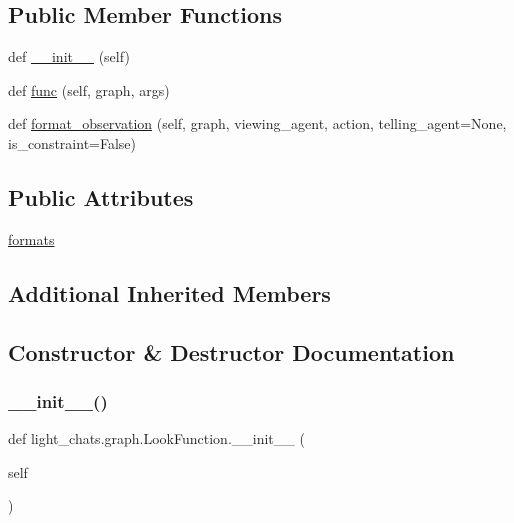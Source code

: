 \subsection*{Public Member Functions}
\begin{DoxyCompactItemize}
\item 
def \hyperlink{classlight__chats_1_1graph_1_1LookFunction_a2b2692f97a52251a450c60d10a80f37e}{\+\_\+\+\_\+init\+\_\+\+\_\+} (self)
\item 
def \hyperlink{classlight__chats_1_1graph_1_1LookFunction_aeaedd1fa680a930dc86a1120d9daf63d}{func} (self, graph, args)
\item 
def \hyperlink{classlight__chats_1_1graph_1_1LookFunction_a7723e1da8ce79443c49fd4a5f6dce978}{format\+\_\+observation} (self, graph, viewing\+\_\+agent, action, telling\+\_\+agent=None, is\+\_\+constraint=False)
\end{DoxyCompactItemize}
\subsection*{Public Attributes}
\begin{DoxyCompactItemize}
\item 
\hyperlink{classlight__chats_1_1graph_1_1LookFunction_a98ca1312bcaf009a34ee3e1b1b43a3d6}{formats}
\end{DoxyCompactItemize}
\subsection*{Additional Inherited Members}


\subsection{Constructor \& Destructor Documentation}
\mbox{\label{classlight__chats_1_1graph_1_1LookFunction_a2b2692f97a52251a450c60d10a80f37e}} 
\subsubsection{\texorpdfstring{\+\_\+\+\_\+init\+\_\+\+\_\+()}{\_\_init\_\_()}}
{\footnotesize\ttfamily def light\+\_\+chats.\+graph.\+Look\+Function.\+\_\+\+\_\+init\+\_\+\+\_\+ (\begin{DoxyParamCaption}\item[{}]{self }\end{DoxyParamCaption})}



